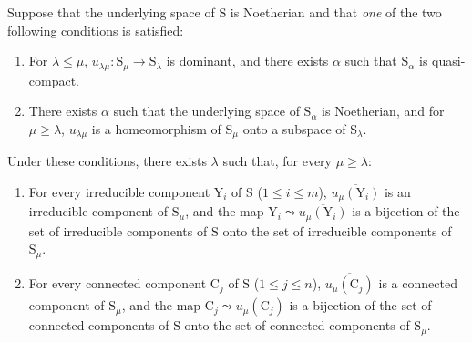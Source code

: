 \begin{proposition}[8.4.2]
\label{IV.8.4.2}
Suppose that the underlying space of $\mathrm{S}$ is Noetherian and that \emph{one} of the two following conditions is satisfied:
\begin{enumerate}[label=\emph{\alph*)}]
  \item For $\lambda\leqslant\mu$, $u_{\lambda\mu}:\mathrm{S}_\mu\to\mathrm{S}_\lambda$ is dominant, and there exists $\alpha$ such that $\mathrm{S}_\alpha$ is quasi-compact.
  \item There exists $\alpha$ such that the underlying space of $\mathrm{S}_\alpha$ is Noetherian, and for $\mu\geqslant\lambda$, $u_{\lambda\mu}$ is a homeomorphism of $\mathrm{S}_\mu$ onto a subspace of $\mathrm{S}_\lambda$.
\end{enumerate}
Under these conditions, there exists $\lambda$ such that, for every $\mu\geqslant\lambda$:
\begin{enumerate}[label=\textup{(\roman*)}]
  \item For every irreducible component $\mathrm{Y}_i$ of $\mathrm{S}$ ($1\leqslant i\leqslant m$), $\overline{u_\mu(\mathrm{Y}_i)}$ is an irreducible component of $\mathrm{S}_\mu$, and the map $\mathrm{Y}_i\leadsto\overline{u_\mu(\mathrm{Y}_i)}$ is a bijection of the set of irreducible components of $\mathrm{S}$ onto the set of irreducible components of $\mathrm{S}_\mu$.
  \item For every connected component $\mathrm{C}_j$ of $\mathrm{S}$ ($1\leqslant j\leqslant n$), $\overline{u_\mu(\mathrm{C}_j)}$ is a connected component of $\mathrm{S}_\mu$, and the map $\mathrm{C}_j\leadsto\overline{u_\mu(\mathrm{C}_j)}$ is a bijection of the set of connected components of $\mathrm{S}$ onto the set of connected components of $\mathrm{S}_\mu$.
\end{enumerate}
\end{proposition}

